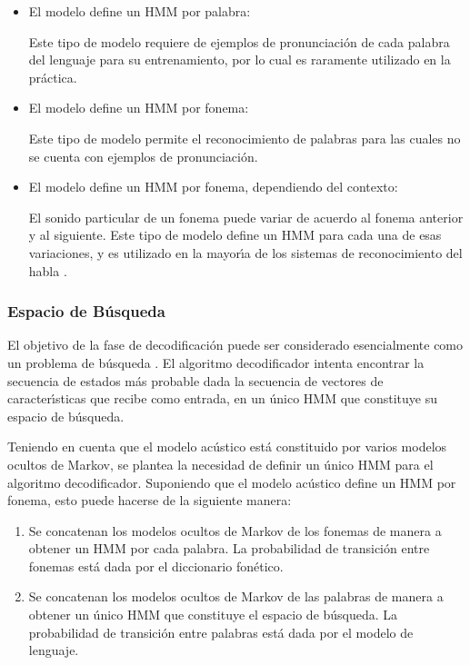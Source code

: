\begin{itemize}
 	\item El modelo define un HMM por palabra:


 		Este tipo de modelo requiere de ejemplos de pronunciaci\'on de cada palabra del lenguaje para 
 		su entrenamiento, por lo cual es raramente utilizado en la pr\'actica.
 	\item El modelo define un HMM por fonema:


 		Este tipo de modelo permite el reconocimiento
 		de palabras para las cuales no se cuenta con ejemplos de pronunciaci\'on.
 	\item El modelo define un HMM por fonema, dependiendo del contexto:


 		El sonido particular de un fonema puede variar de acuerdo al fonema anterior y al siguiente.
 		Este tipo de modelo define un HMM para cada una de esas variaciones, y es utilizado
 		en la mayor{\'\i}a de los sistemas de reconocimiento del habla \cite{Odell95theuse}.
 \end{itemize}  

\subsubsection{Espacio de B\'usqueda}
El objetivo de la fase de decodificaci\'on puede ser considerado esencialmente como un problema de 
b\'usqueda \cite{huang-handbook10}.
El algoritmo decodificador intenta encontrar la secuencia de estados m\'as probable dada la secuencia de
vectores de caracter{\'\i}sticas que recibe como entrada, en un \'unico HMM que constituye su espacio de b\'usqueda.

Teniendo en cuenta que el modelo ac\'ustico est\'a constituido por varios modelos ocultos de Markov, se plantea
la necesidad de definir un \'unico HMM para el algoritmo decodificador. Suponiendo que el modelo ac\'ustico define
un HMM por fonema, esto puede hacerse de la siguiente manera:

\begin{enumerate}
	\item Se concatenan los modelos ocultos de Markov de los fonemas de manera a obtener un HMM por cada palabra. 
	La probabilidad de transici\'on entre fonemas est\'a dada por el diccionario fon\'etico.
	\item Se concatenan los modelos ocultos de Markov de las palabras de manera a obtener un \'unico HMM que
	constituye el espacio de b\'usqueda. La probabilidad de transici\'on entre palabras est\'a dada por el modelo
	de lenguaje.
\end{enumerate}

